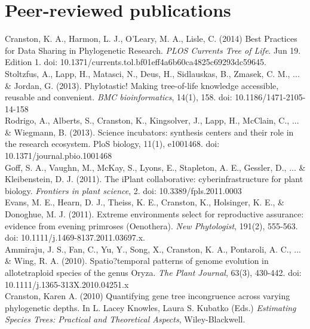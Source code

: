 \documentclass[10pt]{article}
\begin{document}
\section*{Peer-reviewed publications}

\noindent Cranston, K. A., Harmon, L. J., O'Leary, M. A., Lisle, C. (2014) Best Practices for Data Sharing in Phylogenetic Research. \textit{PLOS Currents Tree of Life}. Jun 19. Edition 1. doi: 10.1371/currents.tol.bf01eff4a6b60ca4825c69293dc59645. \\

\noindent Stoltzfus, A., Lapp, H., Matasci, N., Deus, H., Sidlauskas, B., Zmasek, C. M., ... \& Jordan, G. (2013). Phylotastic! Making tree-of-life knowledge accessible, reusable and convenient. \textit{BMC bioinformatics}, 14(1), 158. doi: 10.1186/1471-2105-14-158 \\

\noindent Rodrigo, A., Alberts, S., Cranston, K., Kingsolver, J., Lapp, H., McClain, C., ... \& Wiegmann, B. (2013). Science incubators: synthesis centers and their role in the research ecosystem. PloS biology, 11(1), e1001468. doi: 10.1371/journal.pbio.1001468 \\

\noindent Goff, S. A., Vaughn, M., McKay, S., Lyons, E., Stapleton, A. E., Gessler, D., ... \& Kleibenstein, D. J. (2011). The iPlant collaborative: cyberinfrastructure for plant biology. \textit{Frontiers in plant science}, 2. doi: 10.3389/fpls.2011.0003 \\

\noindent Evans, M. E., Hearn, D. J., Theiss, K. E., Cranston, K., Holsinger, K. E., \& Donoghue, M. J. (2011). Extreme environments select for reproductive assurance: evidence from evening primroses (Oenothera). \textit{New Phytologist}, 191(2), 555-563. doi: 10.1111/j.1469-8137.2011.03697.x.\\

\noindent Ammiraju, J. S., Fan, C., Yu, Y., Song, X., Cranston, K. A., Pontaroli, A. C., ... \& Wing, R. A. (2010). Spatio?temporal patterns of genome evolution in allotetraploid species of the genus Oryza. \textit{The Plant Journal}, 63(3), 430-442. doi: 10.1111/j.1365-313X.2010.04251.x \\

\noindent Cranston, Karen A. (2010) Quantifying gene tree incongruence across varying phylogenetic depths. In L. Lacey Knowles, Laura S. Kubatko (Eds.) \textit{Estimating Species Trees: Practical and Theoretical Aspects}, Wiley-Blackwell.\\
\end{document}
